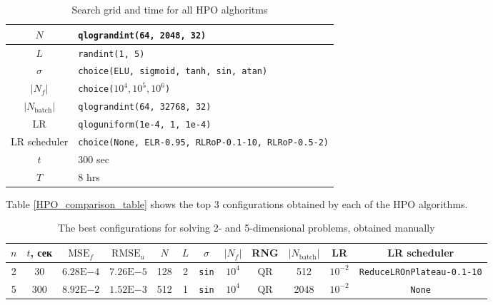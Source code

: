 \documentclass[reprint,
superscriptaddress,
amsmath,amssymb,aps,showkeys,showpacs,
twoside,final,secnumarabic,%
nofootinbib]{revtex4-2}
\begin{document}
\begin{table}[h]
\begin{center}\caption{Search grid and time for all HPO alghoritms}
\label{HPO_comparison_search_space}
\renewcommand{\arraystretch}{1.25}
\renewcommand{\tabcolsep}{3pt}
\begin{tabular}{|c|p{2in}|}\hline
$N$ & \texttt{qlograndint(64, 2048, 32)} \\ \hline
$L$ & \texttt{randint(1, 5)} \\ \hline
$\sigma$ & \texttt{choice(ELU, sigmoid, tanh, sin, atan)} \\ \hline
$|N_f|$ & \texttt{choice($10^4, 10^5, 10^6$)} \\ \hline
$|N_\mathrm{batch}|$ & \texttt{qlograndint(64, 32768, 32)} \\ \hline
LR & \texttt{qloguniform(1e-4, 1, 1e-4)} \\ \hline
LR scheduler & \texttt{choice(None, ELR-0.95, RLRoP-0.1-10, RLRoP-0.5-2)} \\ \hline
$t$ & 300 sec \\ \hline
$T$ & 8 hrs \\ \hline
\end{tabular}
\end{center}
\end{table}

Table \ref{HPO_comparison_table} shows the top 3 configurations obtained by each of the HPO algorithms.

\begin{table}
	\renewcommand{\arraystretch}{1.25}
	\renewcommand{\tabcolsep}{3pt}
	\caption{The best configurations for solving 2- and 5-dimensional problems, obtained manually}
	\label{manual_HPO_table}
	\begin{tabular}{|*{12}{c|}}\hline
		$n$ & $t$, сек & $\mathrm{MSE}_f$ & $\mathrm{RMSE}_u$ & $N$ & $L$ & $\sigma$ & $|N_f|$ & RNG & $|N_\mathrm{batch}|$ & LR & LR scheduler \\ \hline
		2 & 30 & $6.28\mathrm{E}{-4}$ & $7.26\mathrm{E}{-5}$ & 128 & 2 & \texttt{sin} & $10^4$ & QR & 512 & $10^{-2}$ & \texttt{ReduceLROnPlateau-0.1-10} \\ \hline
		5 & 300 & $8.92\mathrm{E}{-2}$ & $1.52\mathrm{E}{-3}$ & 512 & 1 & \texttt{sin} & $10^4$ & QR & 2048 & $10^{-2}$ & \texttt{None} \\ \hline
	\end{tabular}
\end{table}
\end{document}
